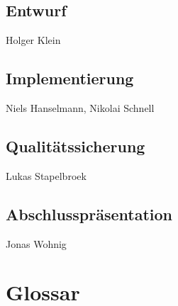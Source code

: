 \documentclass[a4paper]{scrreprt}
\begin{document}
\section{Entwurf} Holger Klein 
\section{Implementierung} Niels Hanselmann, Nikolai Schnell
\section{Qualitätssicherung} Lukas Stapelbroek
\section{Abschlusspräsentation} Jonas Wohnig

\chapter{Glossar}
 

\printglossaries
 

\listoffigures
 
\end{document}
